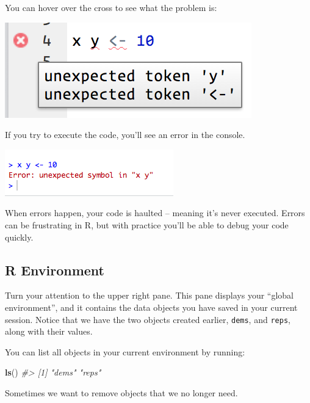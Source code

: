 \documentclass[]{book}
\newenvironment{Shaded}{\begin{snugshade}}{\end{snugshade}}
\newcommand{\KeywordTok}[1]{\textcolor[rgb]{0.13,0.29,0.53}{\textbf{#1}}}
\newcommand{\CommentTok}[1]{\textcolor[rgb]{0.56,0.35,0.01}{\textit{#1}}}
\newcommand{\NormalTok}[1]{#1}
\begin{document}
You can hover over the cross to see what the problem is:

\begin{center}\includegraphics[width=0.7\linewidth]{img/rstudio-diagnostic-tip} \end{center}

If you try to execute the code, you'll see an error in the console.

\begin{center}\includegraphics[width=0.7\linewidth]{img/error} \end{center}

When errors happen, your code is haulted -- meaning it's never executed.
Errors can be frustrating in R, but with practice you'll be able to
debug your code quickly.

\subsection{R Environment}\label{r-environment}

Turn your attention to the upper right pane. This pane displays your
``global environment'', and it contains the data objects you have saved
in your current session. Notice that we have the two objects created
earlier, \texttt{dems}, and \texttt{reps}, along with their values.

You can list all objects in your current environment by running:

\begin{Shaded}
\begin{Highlighting}[]
\KeywordTok{ls}\NormalTok{()}
\CommentTok{#> [1] "dems" "reps"}
\end{Highlighting}
\end{Shaded}

Sometimes we want to remove objects that we no longer need.
\end{document}

